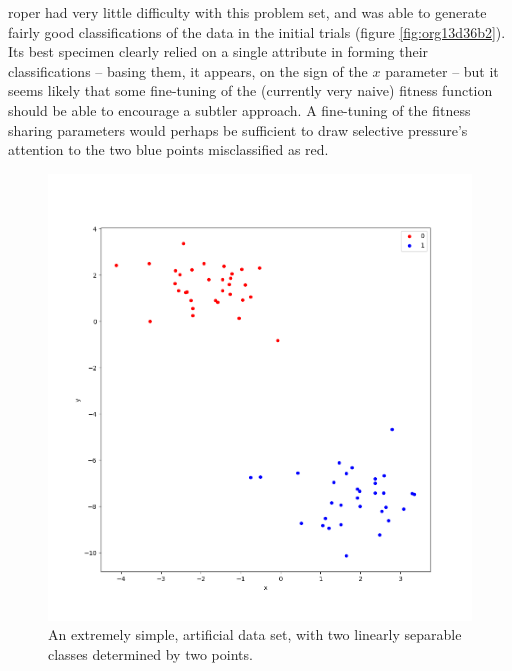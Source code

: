 \documentclass[12pt,glossary]{dalthesis}
\begin{document}
\gls{roper} had very little difficulty with this problem set, and was able to
generate fairly good classifications of the data in the initial trials (figure 
\ref{fig:org13d36b2}). Its best specimen clearly relied on a single
attribute in forming their classifications -- basing them, it appears, on the
sign of the \(x\) parameter -- but it seems likely that some fine-tuning of the
(currently very naive) fitness function should be able to encourage a subtler
approach. A fine-tuning of the fitness sharing parameters would perhaps be
sufficient to draw selective pressure's attention to the two blue points
misclassified as red.

\begin{figure}[htbp]
\centering
\includegraphics[width=.9\linewidth]{../images/plots/2_simple_blobs.png}
\caption{\label{fig:org4872f4f}
An extremely simple, artificial data set, with two linearly separable classes determined by two points.}
\end{figure}
\end{document}
